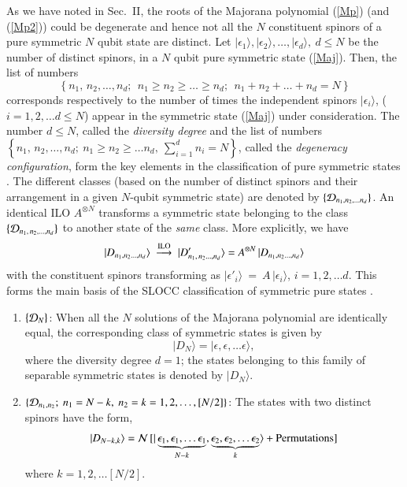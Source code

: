 {As we have noted in Sec.~II,  the roots of the Majorana polynomial (\ref{Mp}) (and (\ref{Mp2})) could be degenerate  and hence not all the  $N$ constituent spinors of a pure symmetric $N$ qubit state are distinct. Let $\vert \epsilon_1\rangle, \vert \epsilon_2\rangle,\ldots, \vert \epsilon_d\rangle,\ d\leq N$ be the number of distinct spinors, in a $N$ qubit pure symmetric state (\ref{Maj}).  Then, the list of numbers 
$$
\left\{n_1,\,n_2,\ldots ,n_d;\ \ n_1\geq n_2\geq\ldots \geq n_d; \ \  n_1+n_2+\ldots+n_d=N\right\}
$$ 
corresponds respectively to the number of times the independent spinors $\vert\epsilon_i\rangle$, ($i=1,2,\ldots d\leq N$) appear in the symmetric state (\ref{Maj}) under consideration. The number $d\leq N$, called the {\em diversity degree} and the list of numbers $\left\{n_1,\,n_2,\ldots ,n_d;\  n_1\geq n_2\geq \ldots n_d,\  \sum_{i=1}^{d} n_i=N\right\}$, called the {\em degeneracy configuration}, form the key elements in the classification of  pure symmetric states \cite{solano}. The different classes  (based on the number of distinct spinors and their arrangement in a given $N$-qubit symmetric state)  are denoted by $\{{\cal D}_{n_1,n_2,\ldots n_d}\}$. An identical ILO $A^{\otimes N}$ transforms a symmetric state belonging to the class $\{ {\cal D}_{n_1,\,n_2,\ldots, n_d}\}$ to another state of the {\em same} class. More explicitly, we have 
\begin{equation}
\vert D_{n_1,n_2\ldots, n_d}\rangle \ \stackrel{\rm  ILO}{\longrightarrow}\ \vert D'_{n_1,\,n_2\ldots, n_d}\rangle={A}^{\otimes N}\,\vert D_{n_1,n_2\ldots, n_d}\rangle\label{chap29-eq12}
\end{equation}  
with the constituent spinors transforming as 
$\vert\epsilon'_i\rangle~=~A\, \vert\epsilon_i\rangle$, $i=1,2,\ldots d$. This forms the main basis of the SLOCC classification of symmetric pure 
states \cite{solano}. 
\begin{enumerate}
\item $\{{\cal D}_N\}$: When all the $N$ solutions of the Majorana polynomial are identically equal, the corresponding class of  symmetric states is given by 
\begin{equation}
\vert D_N\rangle=\vert \epsilon,\epsilon,\ldots \epsilon\rangle,
\end{equation} 
where the diversity degree  $d=1$; the states belonging to this family of separable symmetric states  is denoted by $\vert D_N \rangle$.  

\item $\{{\cal D}_{n_1,n_2};\ n_1=N-k,\ n_2=k=1,2,\ldots, [N/2]\}$: The  states with two distinct spinors have the form, 
\begin{equation}
\vert D_{N-k,k}\rangle={\cal N}\,[\vert \underbrace{\epsilon_1, \epsilon_1,\ldots \epsilon_1}_{N-k}, \underbrace{\epsilon_2, \epsilon_2,\ldots \epsilon_2}_{k}\rangle+{\rm  Permutations}]\label{n1n2}
\end{equation} 
where $k=1,2, \ldots [N/2]$.  


\end{enumerate}}
